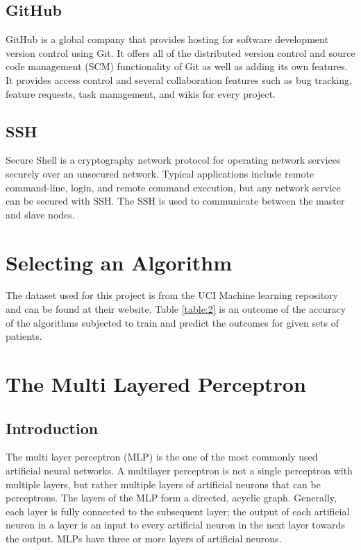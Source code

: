 \documentclass[12pt]{article}
\begin{document}
\subsection{GitHub}
GitHub is a global company that provides hosting for software development version control using Git. It offers all of the distributed version control and source code management (SCM) functionality of Git as well as adding its own features. It provides access control and several collaboration features such as bug tracking, feature requests, task management, and wikis for every project.

\subsection{SSH}
Secure Shell is a cryptography network protocol for operating network services securely over an unsecured network. Typical applications include remote command-line, login, and remote command execution, but any network service can be secured with SSH. The SSH is used to communicate between the master and slave nodes.

\newpage
\section{Selecting an Algorithm}
The dataset used for this project is from the UCI Machine learning repository and can be found at their website. Table \ref{table:2} is an outcome of the accuracy of the algorithms subjected to train and predict the outcomes for given sets of patients. 

\newpage
\section{The Multi Layered Perceptron}
\subsection{Introduction}
The multi layer perceptron (MLP) is the one of the most commonly used artificial neural networks. A multilayer perceptron is not a single perceptron with multiple layers, but rather multiple layers of artificial neurons that can be perceptrons. The layers of the MLP form a directed, acyclic graph. Generally, each layer is fully connected to the subsequent layer; the output of each artificial neuron in a layer is an input to every artificial neuron in the next layer towards the output. MLPs have three or more layers of artificial neurons.
\end{document}
